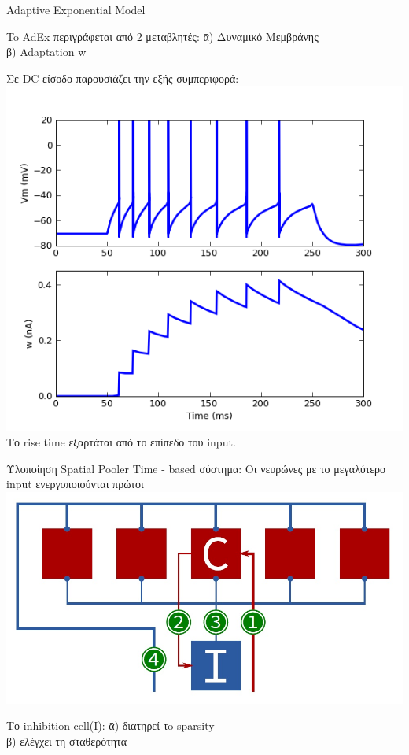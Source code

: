 \documentclass[11pt,center]{beamer}
\begin{document}
	\begin{frame}{Adaptive Exponential Model}
		\begin{tabbing}
  			To AdEx περιγράφεται από 2 μεταβλητές:  \=α) Δυναμικό Μεμβράνης\\
  			\>β) Adaptation w
  		\end{tabbing}
  			\pause
  			Σε DC είσοδο παρουσιάζει την εξής συμπεριφορά:
  			\includegraphics[width=0.4 \textwidth,center]{../pics/adex.jpg}
  			\pause
  			\vfill
  			Tο rise time εξαρτάται από το επίπεδο του input.

		 
	\end{frame}
	
	
	
	
	
	\begin{frame}{Υλοποίηση Spatial Pooler}
		Time - based σύστημα: Οι νευρώνες με το μεγαλύτερο input ενεργοποιούνται πρώτοι\\
		\vspace{2em}
		\includegraphics[width=0.5 \textwidth,center]{../pics/spatial_hardware.jpg}
		\pause
		\vfill
		\begin{tabbing}
  			Το inhibition cell(I):  \= α) διατηρεί τo sparsity\\
  			\> β) ελέγχει τη σταθερότητα\\
  		\end{tabbing}
	\end{frame}
	
\end{document}
